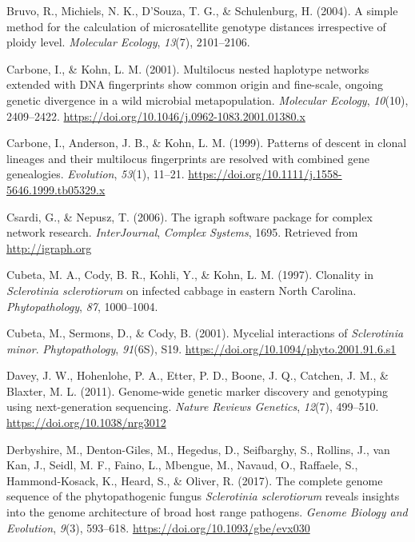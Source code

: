 \documentclass[fleqn,10pt,lineno]{wlpeerj} %
\theoremstyle{definition}
\theoremstyle{definition}
\theoremstyle{definition}
\theoremstyle{remark}
\begin{document}
\hypertarget{ref-bruvo2004simple}{}
Bruvo, R., Michiels, N. K., D'Souza, T. G., \& Schulenburg, H. (2004). A
simple method for the calculation of microsatellite genotype distances
irrespective of ploidy level. \emph{Molecular Ecology}, \emph{13}(7),
2101--2106.

\hypertarget{ref-carbone2001multilocus}{}
Carbone, I., \& Kohn, L. M. (2001). Multilocus nested haplotype networks
extended with DNA fingerprints show common origin and fine-scale,
ongoing genetic divergence in a wild microbial metapopulation.
\emph{Molecular Ecology}, \emph{10}(10), 2409--2422.
\url{https://doi.org/10.1046/j.0962-1083.2001.01380.x}

\hypertarget{ref-carbone1999patterns}{}
Carbone, I., Anderson, J. B., \& Kohn, L. M. (1999). Patterns of descent
in clonal lineages and their multilocus fingerprints are resolved with
combined gene genealogies. \emph{Evolution}, \emph{53}(1), 11--21.
\url{https://doi.org/10.1111/j.1558-5646.1999.tb05329.x}

\hypertarget{ref-csardi2006igraph}{}
Csardi, G., \& Nepusz, T. (2006). The igraph software package for
complex network research. \emph{InterJournal}, \emph{Complex Systems},
1695. Retrieved from \url{http://igraph.org}

\hypertarget{ref-cubeta1997clonality}{}
Cubeta, M. A., Cody, B. R., Kohli, Y., \& Kohn, L. M. (1997). Clonality
in \emph{Sclerotinia sclerotiorum} on infected cabbage in eastern North
Carolina. \emph{Phytopathology}, \emph{87}, 1000--1004.

\hypertarget{ref-cubeta2001mycelial}{}
Cubeta, M., Sermons, D., \& Cody, B. (2001). Mycelial interactions of
\emph{Sclerotinia minor}. \emph{Phytopathology}, \emph{91}(6S), S19.
\url{https://doi.org/10.1094/phyto.2001.91.6.s1}

\hypertarget{ref-davey2011genome}{}
Davey, J. W., Hohenlohe, P. A., Etter, P. D., Boone, J. Q., Catchen, J.
M., \& Blaxter, M. L. (2011). Genome-wide genetic marker discovery and
genotyping using next-generation sequencing. \emph{Nature Reviews
Genetics}, \emph{12}(7), 499--510. \url{https://doi.org/10.1038/nrg3012}

\hypertarget{ref-derbyshire2017complete}{}
Derbyshire, M., Denton-Giles, M., Hegedus, D., Seifbarghy, S., Rollins,
J., van Kan, J., Seidl, M. F., Faino, L., Mbengue, M., Navaud, O.,
Raffaele, S., Hammond-Kosack, K., Heard, S., \& Oliver, R. (2017). The
complete genome sequence of the phytopathogenic fungus \emph{Sclerotinia
sclerotiorum} reveals insights into the genome architecture of broad
host range pathogens. \emph{Genome Biology and Evolution}, \emph{9}(3),
593--618. \url{https://doi.org/10.1093/gbe/evx030}
\end{document}
